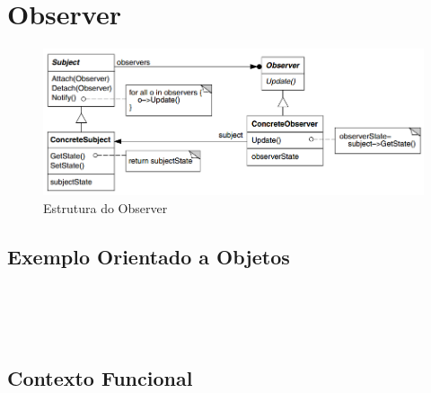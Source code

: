 \section{Observer}

\begin{figure}[htb]
	\caption{\label{observer_struct}Estrutura do Observer}
	\begin{center}
	    \includegraphics[scale=0.5]{5_padroes-contexto-funcional/5.3_comportamentais/5.3.07_observer/diagram.png}
	\end{center}
\end{figure}

\subsection*{Exemplo Orientado a Objetos}

\begin{lstlisting}[caption={Observer Orientação a Objetos},label=ooobserver]


    
\end{lstlisting}

\subsection*{Contexto Funcional}


\begin{lstlisting}[caption={Observer Funcional},label=fpobserver]
    

    
\end{lstlisting}